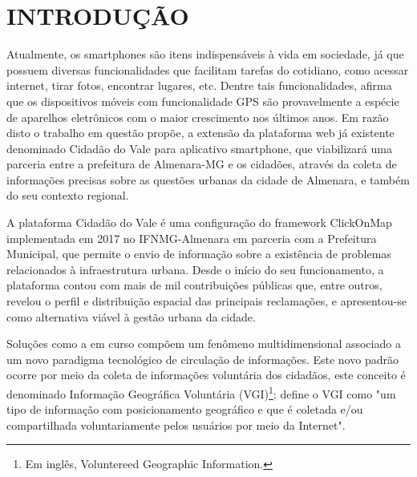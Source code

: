 \chapter*[INTRODUÇÃO]{INTRODUÇÃO}
\label{cap:Introducao}

 Atualmente, os smartphones são itens indispensáveis à vida em sociedade, já que possuem diversas funcionalidades que facilitam tarefas do cotidiano, como acessar internet, tirar fotos, encontrar lugares, etc. Dentre tais funcionalidades,  afirma que os dispositivos móveis com funcionalidade GPS são provavelmente a espécie de aparelhos eletrônicos com o maior crescimento nos últimos anos. Em razão disto o trabalho em questão propõe, a extensão da plataforma web já existente denominado Cidadão do Vale para aplicativo smartphone, que viabilizará uma parceria entre a prefeitura de Almenara-MG e os cidadões, através da coleta de informações precisas sobre as questões urbanas da cidade de Almenara, e também do seu contexto regional.  
 
 A plataforma Cidadão do Vale é uma configuração do framework ClickOnMap implementada em 2017 no IFNMG-Almenara em parceria com a Prefeitura Municipal, que permite o envio de informação sobre a existência de problemas relacionados à infraestrutura urbana. Desde o início do seu funcionamento, a plataforma contou com mais de mil contribuições públicas que, entre outros, revelou o perfil e distribuição espacial das principais reclamações, e apresentou-se como alternativa viável à gestão urbana da cidade.
 
 Soluções como a em curso compõem um fenômeno multidimensional associado a um novo paradigma tecnológico de circulação de informações. Este novo padrão ocorre por meio da coleta de informações voluntária dos cidadãos, este conceito é denominado Informação Geográfica Voluntária (VGI)\footnote{Em inglês, Voluntereed Geographic Information.};  define o VGI como "um tipo de informação com posicionamento geográfico e que é coletada e/ou compartilhada voluntariamente pelos usuários por meio da Internet".

